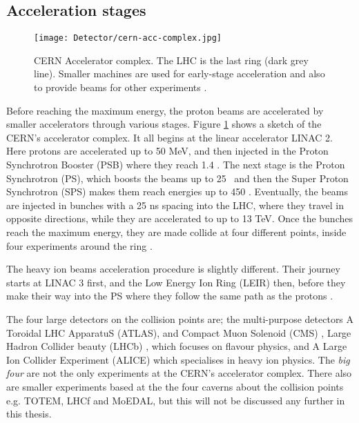 		\subsection*{Acceleration stages}

			\begin{figure}[!htb]
				\texttt{[image: Detector/cern-acc-complex.jpg]}
				\caption{CERN Accelerator complex. The LHC is the last ring (dark grey line). Smaller machines are used for early-stage acceleration and also to provide beams for other experiments \cite{Lefevre2008}.}
				\label{fig:cern-acc-complex}
			\end{figure}

			Before reaching the maximum energy, the proton beams are accelerated by smaller accelerators through various stages. Figure \ref{fig:cern-acc-complex} shows a sketch of the CERN's accelerator complex. It all begins at the linear accelerator LINAC 2. Here protons are accelerated up to 50 MeV, and then injected in the Proton Synchrotron Booster (PSB) where they reach 1.4 \GeV. The next stage is the Proton Synchrotron (PS), which boosts the beams up to 25 \GeV\, and then the Super Proton Synchrotron (SPS) makes them reach energies up to 450 \GeV. Eventually, the beams are injected in bunches with a 25 ns spacing into the LHC, where they travel in opposite directions, while they are accelerated to up to 13 TeV. Once the bunches reach the maximum energy, they are made collide at four different points, inside four experiments around the ring \cite{LHCDesignReport}. 

			The heavy ion beams acceleration procedure is slightly different. Their journey starts at LINAC 3 first, and the Low Energy Ion Ring (LEIR) then, before they make their way into the PS where they follow the same path as the protons \cite{LHCDesignReport}. 

			The four large detectors on the collision points are; the multi-purpose detectors A Toroidal LHC ApparatuS (ATLAS), and Compact Muon Solenoid (CMS) \cite{CMSJINST}, Large Hadron Collider beauty (LHCb) \cite{LHCb2008}, which focuses on flavour physics, and A Large Ion Collider Experiment (ALICE) \cite{ALICEJINST} which specialises in heavy ion physics. The \emph{big four} are not the only experiments at the CERN's accelerator complex. There also are smaller experiments based at the the four caverns about the collision points e.g. TOTEM, LHCf and MoEDAL, but this will not be discussed any further in this thesis.
		


